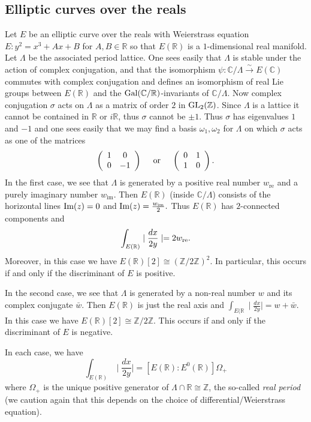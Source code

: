 \documentclass[12pt]{amsart}
\numberwithin{equation}{section}
\theoremstyle{remark}
\theoremstyle{definition}
\theoremstyle{definition}
\theoremstyle{definition}
\theoremstyle{definition}
\theoremstyle{definition}
\theoremstyle{definition}
\theoremstyle{definition}
\begin{document}
\subsection{Elliptic curves over the reals}

Let $E$ be an elliptic curve over the reals with Weierstrass equation $E:y^2=x^3+Ax+B$ for $A,B\in \mathbb{R}$ so that $E(\mathbb{R})$ is a $1$-dimensional real manifold. Let $\Lambda$ be the associated period lattice.  One sees easily that $\Lambda$ is stable under the action of complex conjugation, and that the isomorphism $\psi:\mathbb{C}/\Lambda\stackrel{\sim}{\rightarrow}E(\mathbb{C})$ commutes with complex conjugation and defines an isomorphism of real Lie groups between $E(\mathbb{R})$ and the $\textup{Gal}(\mathbb{C}/\mathbb{R})$-invariants of $\mathbb{C}/\Lambda$. Now complex conjugation $\sigma$ acts on $\Lambda$ as a matrix of order $2$ in $\textup{GL}_2(\mathbb{Z})$. Since $\Lambda$ is a lattice it cannot be contained in $\mathbb{R}$ or $i\mathbb{R}$, thus $\sigma$ cannot be $\pm 1$. Thus $\sigma$ has eigenvalues $1$ and $-1$ and one sees easily that we may find a basis $\omega_1,\omega_2$  for $\Lambda$ on which $\sigma$ acts as one of the matrices
\[\left(\begin{array}{cc}
1 & 0\\
0 & -1
\end{array}\right)~~~\textup{ or }~~~\left(\begin{array}{cc}
0 &1\\
1 &0
\end{array}\right).\]
In the first case, we see that $\Lambda$ is generated by a positive real number $w_\text{re}$ and a purely imaginary number $w_\text{im}$. Then $E(\mathbb{R})$ (inside $\mathbb{C}/\Lambda$) consists of the horizontal lines $\textup{Im}(z)=0$ and $\textup{Im}(z)=\frac{w_\text{im}}{2}.$ Thus $E(\mathbb{R})$ has $2$-connected components and 
\[\int_{E(\mathbb{R})}\mid\frac{dx}{2y}\mid=2w_\textup{re}.\]
Moreover, in this case we have $E(\mathbb{R})[2]\cong (\mathbb{Z}/2\mathbb{Z})^2$. In particular, this occurs if and only if the discriminant of $E$ is positive. 

In the second case, we see that $\Lambda$ is generated by a non-real number $w$ and its complex conjugate $\bar{w}$. Then $E(\mathbb{R})$ is just the real axis and $\int_{E(\mathbb{R}}\mid\frac{dx}{2y}\mid=w+\bar{w}$. In this case we have $E(\mathbb{R})[2]\cong \mathbb{Z}/2\mathbb{Z}$. This occurs if and only if the discriminant of $E$ is negative.

In each case, we have
\[\int_{E(\mathbb{R})}\mid\frac{dx}{2y}\mid=[E(\mathbb{R}):E^0(\mathbb{R})]\Omega_+\]
where $\Omega_+$ is the unique positive generator of $\Lambda \cap \mathbb{R}\cong \mathbb{Z}$, the so-called \textit{real period} (we caution again that this depends on the choice of differential/Weierstrass equation).
\end{document}
